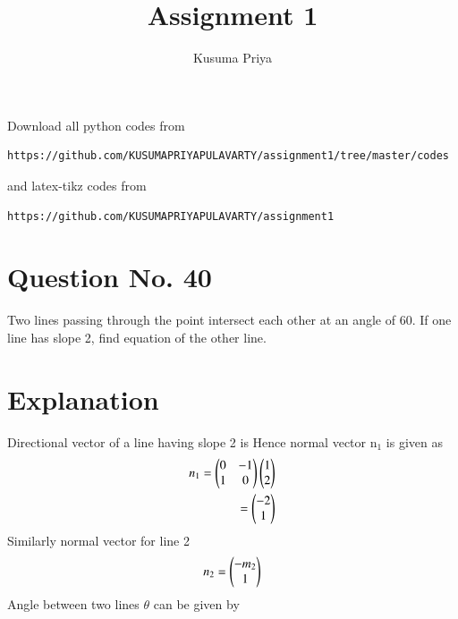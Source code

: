 \documentclass[journal,12pt,twocolumn]{IEEEtran}
\begin{document}
\renewcommand{\thefigure}{\theproblem}

\def\putbox#1#2#3{\makebox[0in][l]{\makebox[#1][l]{}\raisebox{\baselineskip}[0in][0in]{\raisebox{#2}[0in][0in]{#3}}}}
     \def\rightbox#1{\makebox[0in][r]{#1}}
     \def\centbox#1{\makebox[0in]{#1}}
     \def\topbox#1{\raisebox{-\baselineskip}[0in][0in]{#1}}
     \def\midbox#1{\raisebox{-0.5\baselineskip}[0in][0in]{#1}}
\vspace{3cm}
\title{Assignment 1}
\author{Kusuma Priya}

\maketitle
\newpage

\bigskip
\renewcommand{\thefigure}{\theenumi}
\renewcommand{\thetable}{\theenumi}
Download all python codes from 
\begin{lstlisting}
https://github.com/KUSUMAPRIYAPULAVARTY/assignment1/tree/master/codes
\end{lstlisting}
%
and latex-tikz codes from 
%
\begin{lstlisting}
https://github.com/KUSUMAPRIYAPULAVARTY/assignment1
\end{lstlisting}
%
 
 \section{Question No. 40}
Two lines passing through the point  intersect each other at an angle of 60\degree. If one line has slope 2, find equation of the other line. 
%

\section{Explanation}
Directional vector of a line having slope 2 is 
Hence normal vector n$_1$ is given as
\begin{align}
n_1 =\begin{pmatrix}0 & -1\\1 & 0\end{pmatrix}\begin{pmatrix}1\\2\end{pmatrix}\\=\begin{pmatrix}-2\\1\end{pmatrix}
\end{align}
Similarly normal vector for line 2 \\
\begin{align}
n_2 = \begin{pmatrix}-m_2\\1\end{pmatrix}
\end{align}
Angle between two lines $\theta$ can be given by
\end{document}
